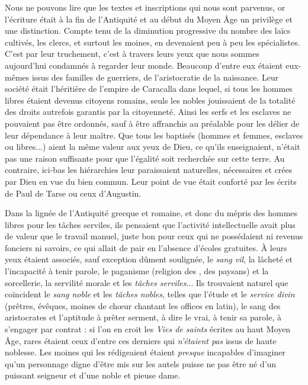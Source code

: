 Nous ne pouvons lire que les textes et inscriptions qui nous sont parvenus, or l'écriture était à la fin de l'Antiquité et au début du Moyen Âge un privilège et une distinction. Compte tenu de la diminution progressive du nombre des laïcs cultivés, les clercs, et surtout les moines, en devenaient peu à peu les spécialistes. C'est par leur truchement, c'est à travers leurs yeux que nous sommes aujourd'hui condamnés à regarder leur monde. Beaucoup d'entre eux étaient eux-mêmes issus des familles de guerriers, de l'aristocratie de la naissance. Leur société était l'héritière de l'empire de Caracalla dans lequel, si tous les hommes libres étaient devenus citoyens romains, seuls les nobles  jouissaient de la totalité des droits autrefois garantis par la citoyenneté. Ainsi les serfs et les esclaves ne pouvaient pas être ordonnés, sauf à être affranchis au préalable pour les délier de leur dépendance à leur maître. Que tous les baptisés (hommes et femmes, esclaves ou libres...) aient la même valeur aux yeux de Dieu, ce qu'ils enseignaient, n'était pas une raison suffisante pour que l'égalité soit recherchée sur cette terre. Au contraire, ici-bas les hiérarchies leur paraissaient naturelles, nécessaires et crées par Dieu en vue du bien commun. Leur point de vue était conforté par les écrits de Paul de Tarse ou ceux d'Augustin.

 Dans la lignée de l'Antiquité grecque et romaine, et donc du mépris des hommes libres pour les tâches serviles, ils pensaient que l'activité intellectuelle avait plus de valeur que le travail manuel, juste bon pour ceux qui ne possédaient ni revenus fonciers ni savoirs, ce qui allait de pair en l'absence d'écoles gratuites. À leurs yeux étaient associés, sauf exception dûment soulignée, le \emph{sang vil}, la lâcheté et l'incapacité à tenir parole, le paganisme (religion des , des paysans) et la sorcellerie, la servilité morale et les \emph{tâches serviles}... Ils trouvaient naturel que coïncident le \emph{sang noble} et les \emph{tâches nobles}, telles que l'étude et le \emph{service divin} (prêtres, évêques, moines de chœur chantant les offices en latin), le sang des aristocrates et l'aptitude à prêter serment, à dire le vrai, à tenir sa parole, à s'engager par contrat : si l'on en croit les \emph{Vies de saints} écrites au haut Moyen Âge, rares étaient ceux d'entre ces derniers qui \emph{n'étaient pas} issus de haute noblesse. Les moines qui les rédigeaient étaient \emph{presque} incapables d'imaginer qu'un personnage digne d'être mis sur les autels puisse ne pas être né d'un puissant seigneur et d'une noble et pieuse dame. 

